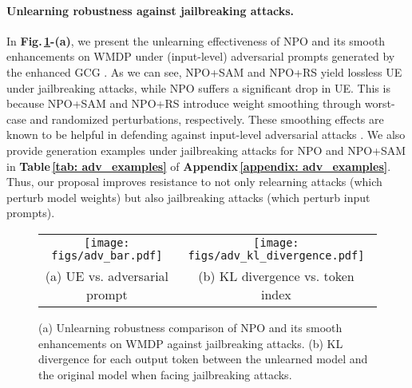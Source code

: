 \paragraph{{Unlearning robustness against jailbreaking attacks.}}
In \textbf{Fig.\,\ref{fig: adv_prompt}-(a)}, we present the unlearning effectiveness of NPO and its
smooth enhancements on WMDP under (input-level) adversarial prompts generated by the  enhanced GCG  \citep{lucki2024adversarial}.
As we can see, 
NPO+SAM and NPO+RS yield lossless UE under jailbreaking attacks, while NPO suffers a significant drop in UE. This is because NPO+SAM and NPO+RS introduce weight smoothing through worst-case and randomized perturbations, respectively. 
These smoothing effects are known to be helpful in defending against input-level adversarial attacks \citep{xu2022weight,wei2023sharpness,zhang2024duality,cohen2019certified}. 
We also provide generation examples under jailbreaking attacks for NPO and NPO+SAM in \textbf{Table\,\ref{tab: adv_examples}} of \textbf{Appendix\,\ref{appendix: adv_examples}}.
Thus, our proposal improves resistance to not only relearning attacks (which perturb model weights) but also jailbreaking attacks (which perturb input prompts).

\begin{figure}[htb]
\vspace{-2mm}
\centering
\begin{tabular}{cc}
\hspace*{-6mm}
\texttt{[image: figs/adv\_bar.pdf]} 
&
\hspace*{-6mm}
\texttt{[image: figs/adv\_kl\_divergence.pdf]}
\vspace*{-1mm}
\\
 \small{(a) UE vs. adversarial prompt} &  \hspace*{-3mm}  
 \small{(b) KL divergence vs. token index}\\
\end{tabular}
\vspace{-3mm}
\caption{\small{
(a) Unlearning robustness comparison of NPO and its smooth enhancements on WMDP against jailbreaking attacks. (b) KL divergence for each output token between the unlearned model and the original model when facing jailbreaking attacks.}
}
\label{fig: adv_prompt}
\end{figure}

